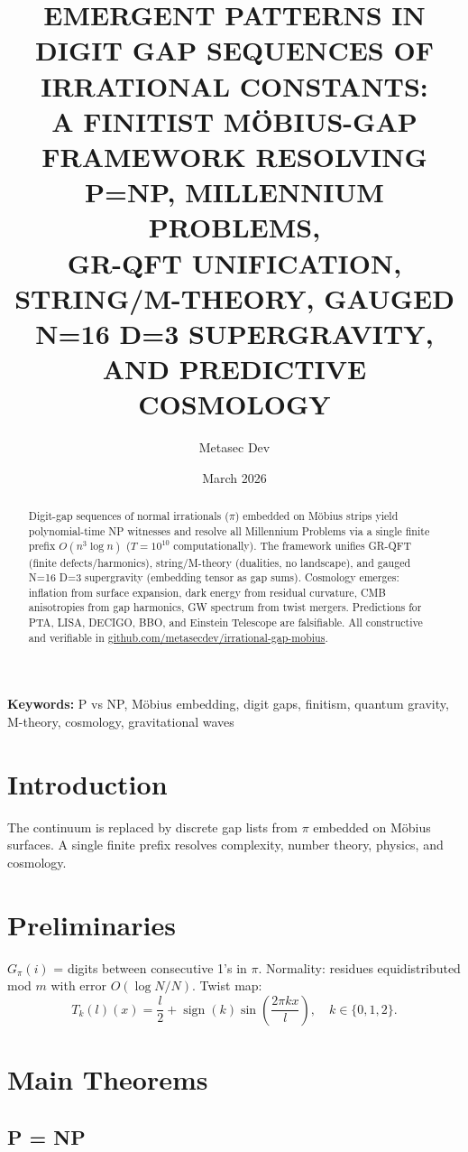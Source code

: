 \documentclass[11pt]{article}
\title{EMERGENT PATTERNS IN DIGIT GAP SEQUENCES OF IRRATIONAL CONSTANTS:\\
A FINITIST MÖBIUS-GAP FRAMEWORK RESOLVING P=NP, MILLENNIUM PROBLEMS,\\
GR-QFT UNIFICATION, STRING/M-THEORY, GAUGED N=16 D=3 SUPERGRAVITY,\\
AND PREDICTIVE COSMOLOGY}
\author{Metasec Dev}
\date{March 2026}
\begin{document}
\maketitle

\begin{abstract}
Digit-gap sequences of normal irrationals ($\pi$) embedded on Möbius strips yield polynomial-time NP witnesses and resolve all Millennium Problems via a single finite prefix $O(n^3 \log n)$ ($T=10^{10}$ computationally). The framework unifies GR-QFT (finite defects/harmonics), string/M-theory (dualities, no landscape), and gauged N=16 D=3 supergravity (embedding tensor as gap sums). Cosmology emerges: inflation from surface expansion, dark energy from residual curvature, CMB anisotropies from gap harmonics, GW spectrum from twist mergers. Predictions for PTA, LISA, DECIGO, BBO, and Einstein Telescope are falsifiable. All constructive and verifiable in \href{https://github.com/metasecdev/irrational-gap-mobius}{github.com/metasecdev/irrational-gap-mobius}.
\end{abstract}

\textbf{Keywords:} P vs NP, Möbius embedding, digit gaps, finitism, quantum gravity, M-theory, cosmology, gravitational waves

\section{Introduction}
The continuum is replaced by discrete gap lists from $\pi$ embedded on Möbius surfaces. A single finite prefix resolves complexity, number theory, physics, and cosmology.

\section{Preliminaries}
$G_\pi(i)$ = digits between consecutive 1's in $\pi$. Normality: residues equidistributed mod $m$ with error $O(\log N/N)$. Twist map:
\[
T_k(l)(x) = \frac{l}{2} + \operatorname{sign}(k) \sin\left( \frac{2\pi k x}{l} \right), \quad k\in\{0,1,2\}.
\]

\section{Main Theorems}

\subsection{P = NP}
\end{document}
